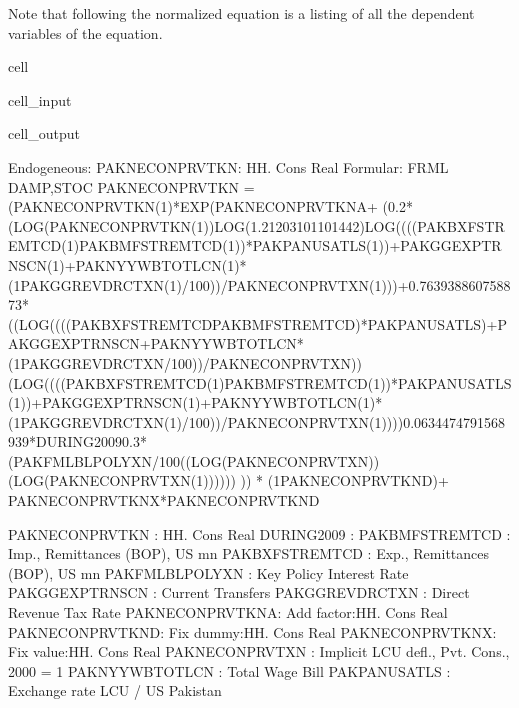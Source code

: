 \documentclass[letterpaper,10pt,english]{jupyterBook}
\begin{document}
\sphinxAtStartPar
Note that following the normalized equation is a listing of all the dependent variables of the equation.

\begin{sphinxuseclass}{cell}\begin{sphinxVerbatimInput}

\begin{sphinxuseclass}{cell_input}
\begin{sphinxVerbatim}[commandchars=\\\{\}]
\end{sphinxVerbatim}

\end{sphinxuseclass}\end{sphinxVerbatimInput}
\begin{sphinxVerbatimOutput}

\begin{sphinxuseclass}{cell_output}
\begin{sphinxVerbatim}[commandchars=\\\{\}]
Endogeneous: PAKNECONPRVTKN: HH. Cons Real
Formular: FRML \PYGZlt{}DAMP,STOC\PYGZgt{} PAKNECONPRVTKN = (PAKNECONPRVTKN(\PYGZhy{}1)*EXP(PAKNECONPRVTKN\PYGZus{}A+ (\PYGZhy{}0.2*(LOG(PAKNECONPRVTKN(\PYGZhy{}1))\PYGZhy{}LOG(1.21203101101442)\PYGZhy{}LOG((((PAKBXFSTREMTCD(\PYGZhy{}1)\PYGZhy{}PAKBMFSTREMTCD(\PYGZhy{}1))*PAKPANUSATLS(\PYGZhy{}1))+PAKGGEXPTRNSCN(\PYGZhy{}1)+PAKNYYWBTOTLCN(\PYGZhy{}1)*(1\PYGZhy{}PAKGGREVDRCTXN(\PYGZhy{}1)/100))/PAKNECONPRVTXN(\PYGZhy{}1)))+0.763938860758873*((LOG((((PAKBXFSTREMTCD\PYGZhy{}PAKBMFSTREMTCD)*PAKPANUSATLS)+PAKGGEXPTRNSCN+PAKNYYWBTOTLCN*(1\PYGZhy{}PAKGGREVDRCTXN/100))/PAKNECONPRVTXN))\PYGZhy{}(LOG((((PAKBXFSTREMTCD(\PYGZhy{}1)\PYGZhy{}PAKBMFSTREMTCD(\PYGZhy{}1))*PAKPANUSATLS(\PYGZhy{}1))+PAKGGEXPTRNSCN(\PYGZhy{}1)+PAKNYYWBTOTLCN(\PYGZhy{}1)*(1\PYGZhy{}PAKGGREVDRCTXN(\PYGZhy{}1)/100))/PAKNECONPRVTXN(\PYGZhy{}1))))\PYGZhy{}0.0634474791568939*DURING\PYGZus{}2009\PYGZhy{}0.3*(PAKFMLBLPOLYXN/100\PYGZhy{}((LOG(PAKNECONPRVTXN))\PYGZhy{}(LOG(PAKNECONPRVTXN(\PYGZhy{}1)))))) )) * (1\PYGZhy{}PAKNECONPRVTKN\PYGZus{}D)+ PAKNECONPRVTKN\PYGZus{}X*PAKNECONPRVTKN\PYGZus{}D  \PYGZdl{}

PAKNECONPRVTKN  : HH. Cons Real
DURING\PYGZus{}2009     : 
PAKBMFSTREMTCD  : Imp., Remittances (BOP), US\PYGZdl{} mn
PAKBXFSTREMTCD  : Exp., Remittances (BOP), US\PYGZdl{} mn
PAKFMLBLPOLYXN  : Key Policy Interest Rate
PAKGGEXPTRNSCN  : Current Transfers
PAKGGREVDRCTXN  : Direct Revenue Tax Rate
PAKNECONPRVTKN\PYGZus{}A: Add factor:HH. Cons Real
PAKNECONPRVTKN\PYGZus{}D: Fix dummy:HH. Cons Real
PAKNECONPRVTKN\PYGZus{}X: Fix value:HH. Cons Real
PAKNECONPRVTXN  : Implicit LCU defl., Pvt. Cons., 2000 = 1
PAKNYYWBTOTLCN  : Total Wage Bill
PAKPANUSATLS    : Exchange rate LCU / US\PYGZdl{} \PYGZhy{} Pakistan
\end{sphinxVerbatim}

\end{sphinxuseclass}\end{sphinxVerbatimOutput}

\end{sphinxuseclass}
\end{document}
